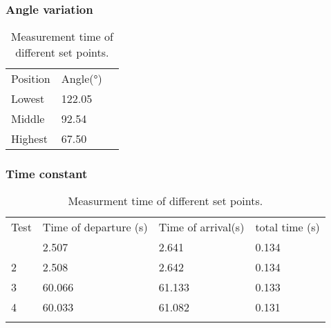 \subsubsection*{Angle variation}


\begin{table}[htbp]
	\centering
	\caption{Measurement time of different set points.}
	\label{tab:AngleData}
	\begin{tabular}{lll}  \hline \hline
		Position & Angle{(}°{)}  \\ \rowcolor{lightGrey}  \hline
		Lowest & 122.05  \\
		Middle & 92.54  \\ \rowcolor{lightGrey}
		Highest & 67.50  \\
	\end{tabular}
\end{table}




\subsubsection*{Time constant}

\begin{table}[htbp]
	\centering
	\caption{Measurment time of different set points.}
	\label{tab:TimeData}
	\begin{tabular}{llll} \hline\hline
		
		Test & Time of departure {(}s{)}& Time of arrival{(}s{)} & total time {(}s{)} \\  \rowcolor{lightGrey}   \hline
		1     & 2.507              & 2.641             & 0.134                     \\
		2     & 2.508              & 2.642 & 0.134                                 \\  \rowcolor{lightGrey}
		3     & 60.066              & 61.133 & 0.133                                 \\ 
		4     & 60.033             & 61.082            & 0.131                    \\  \rowcolor{lightGrey} 
	\end{tabular}
\end{table}


